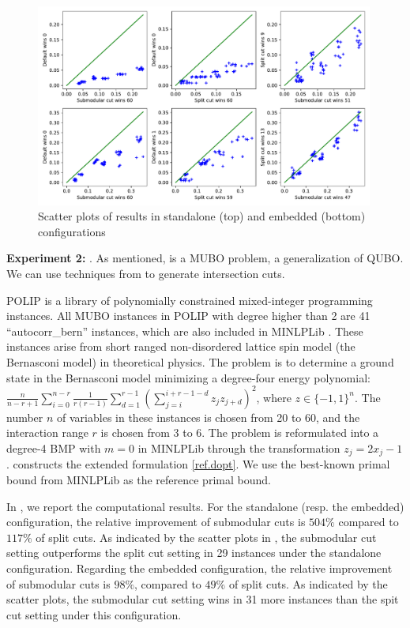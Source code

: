 \begin{figure}[h]
    \centering
    \includegraphics[width=0.99\textwidth]{Chaptersub/media/scatter_qubo.pdf}
    \caption{Scatter plots of \maxcut results in standalone (top) and embedded (bottom) configurations}
    \label{fig:qubo}
\end{figure}


\noindent\textbf{Experiment 2:} \pbm.
As  mentioned, \pbm is a MUBO problem, a generalization of QUBO. We can use techniques from  to generate intersection cuts.   


POLIP \cite{Ulriks} is a library of polynomially constrained
mixed-integer programming instances. All MUBO instances in  POLIP with degree higher than 2 are 41 ``autocorr\_bern'' instances,  which are also included in MINLPLib \cite{minlplib,Vigerske2022Feb}.
These instances arise from short ranged non-disordered lattice spin model (the Bernasconi model) \cite{liers2010non} in theoretical physics. The problem is to determine a ground state in the Bernasconi model  minimizing a degree-four energy polynomial: $\frac{n}{n-r+1}\sum_{i = 0}^{n-r} \frac{1}{r(r-1)} \sum_{d =1}^{r-1}(\sum_{j = i}^{i+r-1-d} z_j z_{j+d})^2$, where $z \in \{-1,1\}^n$. The number $n$ of variables in these instances is chosen from 20 to 60, and the interaction range $r$ is chosen from 3 to 6. The problem is reformulated into a degree-4 BMP with $m = 0$ in MINLPLib through the transformation $z_j = 2x_j -1$.  \scip  constructs the extended formulation \eqref{ref.dopt}. We use the best-known primal bound from MINLPLib as the reference primal bound.  

In , we report the computational results. For the standalone (resp. the embedded) configuration, the relative improvement of submodular cuts is $504\%$  compared to $117\%$   of split cuts. As indicated by the scatter plots in , the submodular cut setting outperforms the split cut setting in 29 instances under the standalone configuration. Regarding the embedded configuration,  the relative improvement of submodular cuts is $98\%$,  compared to $49\%$   of split cuts.  As indicated by the scatter plots, the submodular cut setting wins in 31 more instances than the  spit cut setting under this configuration.


